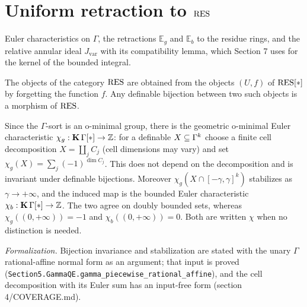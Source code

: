 \section{Uniform retraction to $\mathrm{RES}$}
\label{section-4}
Euler characteristics on $\Gamma$, the retractions $\mathbb{E}_g$ and $\mathbb{E}_b$ to the residue rings, and the relative annular ideal $J_{\mathrm{var}}$ with its compatibility lemma, which Section 7 uses for the kernel of the bounded integral.

\setcounter{theorem}{0}
\begin{definition}
\label{df-res}
\leanok
{}
The objects of the category $\mathrm{RES}$ are obtained from the objects $(U, f)$ of $\mathrm{RES}[*]$ by forgetting the function $f$. Any definable bijection between two such objects is a morphism of $\mathrm{RES}$.
\end{definition}

\setcounter{theorem}{1}
\begin{remark}
\label{s4-euler-characteristics}
\leanok
{}
Since the $\Gamma$-sort is an o-minimal group, there is the geometric o-minimal Euler characteristic $\chi_g : \operatorname{\mathbf{K}} \Gamma[*] \to \mathbb{Z}$: for a definable $X \subseteq \Gamma^k$ choose a finite cell decomposition $X = \coprod_j C_j$ (cell dimensions may vary) and set $\chi_g(X) = \sum_j (-1)^{\dim C_j}$. This does not depend on the decomposition and is invariant under definable bijections. Moreover $\chi_g(X \cap [-\gamma, \gamma]^k)$ stabilizes as $\gamma \to +\infty$, and the induced map is the bounded Euler characteristic $\chi_b : \operatorname{\mathbf{K}} \Gamma[*] \to \mathbb{Z}$. The two agree on doubly bounded sets, whereas $\chi_g((0, +\infty)) = -1$ and $\chi_b((0, +\infty)) = 0$. Both are written $\chi$ when no distinction is needed.

\emph{Formalization.} Bijection invariance and stabilization are stated with the unary $\Gamma$ rational-affine normal form as an argument; that input is proved (\texttt{Section5.GammaQE.gamma\_piecewise\_rational\_affine}), and the cell decomposition with its Euler sum has an input-free form (section 4/COVERAGE.md).
\end{remark}

